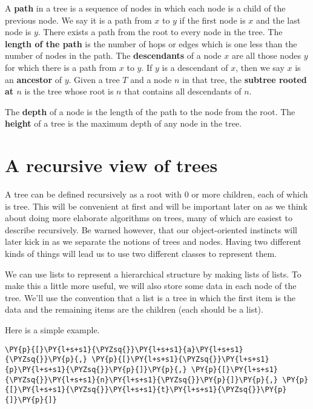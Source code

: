 A \textbf{path} in a tree is a sequence of nodes in which each node is a child of the previous node.
We say it is a path from $x$ to $y$ if the first node is $x$ and the last node is $y$.
There exists a path from the root to every node in the tree.
The \textbf{length of the path} is the number of hops or edges which is one less than the number of nodes in the path.
The \textbf{descendants} of a node $x$ are all those nodes $y$ for which there is a path from $x$ to $y$.
If $y$ is a descendant of $x$, then we say $x$ is an \textbf{ancestor} of $y$.
Given a tree $T$ and a node $n$ in that tree, the \textbf{subtree rooted at $n$} is the tree whose root is $n$ that contains all descendants of $n$.


The \textbf{depth} of a node is the length of the path to the node from the root.
The \textbf{height} of a tree is the maximum depth of any node in the tree.

\section{A recursive view of trees}


A tree can be defined recursively as a root with $0$ or more children, each of which is tree.
This will be convenient at first and will be important later on as we think about doing more elaborate algorithms on trees, many of which are easiest to describe recursively.
Be warned however, that our object-oriented instincts will later kick in as we separate the notions of trees and nodes.
Having two different kinds of things will lead us to use two different classes to represent them.


We can use lists to represent a hierarchical structure by making lists of lists.
To make this a little more useful, we will also store some data in each node of the tree.
We'll use the convention that a list is a tree in which the first item is the data and the remaining items are the children (each should be a list).


Here is a simple example.

\begin{Verbatim}[commandchars=\\\{\}]
\PY{p}{[}\PY{l+s+s1}{\PYZsq{}}\PY{l+s+s1}{a}\PY{l+s+s1}{\PYZsq{}}\PY{p}{,} \PY{p}{[}\PY{l+s+s1}{\PYZsq{}}\PY{l+s+s1}{p}\PY{l+s+s1}{\PYZsq{}}\PY{p}{]}\PY{p}{,} \PY{p}{[}\PY{l+s+s1}{\PYZsq{}}\PY{l+s+s1}{n}\PY{l+s+s1}{\PYZsq{}}\PY{p}{]}\PY{p}{,} \PY{p}{[}\PY{l+s+s1}{\PYZsq{}}\PY{l+s+s1}{t}\PY{l+s+s1}{\PYZsq{}}\PY{p}{]}\PY{p}{]}
\end{Verbatim}



